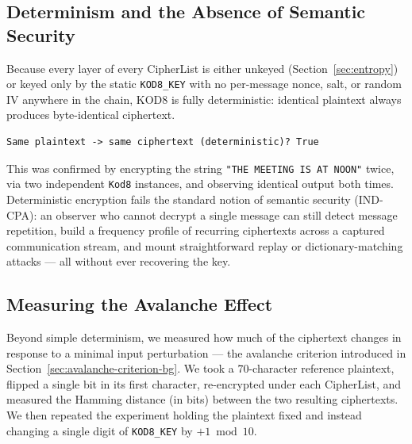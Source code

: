 \documentclass[11pt]{article}
\begin{document}
\subsection{Determinism and the Absence of Semantic Security}

Because every layer of every CipherList is either unkeyed
(Section~\ref{sec:entropy}) or keyed only by the static
\texttt{KOD8\_KEY} with no per-message nonce, salt, or random IV
anywhere in the chain, KOD8 is fully deterministic: identical plaintext
always produces byte-identical ciphertext.

\begin{lstlisting}
Same plaintext -> same ciphertext (deterministic)? True
\end{lstlisting}

This was confirmed by encrypting the string \texttt{"THE MEETING IS AT
NOON"} twice, via two independent \texttt{Kod8} instances, and observing
identical output both times. Deterministic encryption fails the standard
notion of semantic security (IND-CPA): an observer who cannot decrypt a
single message can still detect message repetition, build a
frequency profile of recurring ciphertexts across a captured
communication stream, and mount straightforward replay or
dictionary-matching attacks --- all without ever recovering the key.

\subsection{Measuring the Avalanche Effect}

Beyond simple determinism, we measured how much of the ciphertext
changes in response to a minimal input perturbation --- the avalanche
criterion introduced in Section~\ref{sec:avalanche-criterion-bg}. We took a 70-character reference
plaintext, flipped a single bit in its first character, re-encrypted
under each CipherList, and measured the Hamming distance (in bits)
between the two resulting ciphertexts. We then repeated the experiment
holding the plaintext fixed and instead changing a single digit of
\texttt{KOD8\_KEY} by $+1 \bmod 10$.
\end{document}
